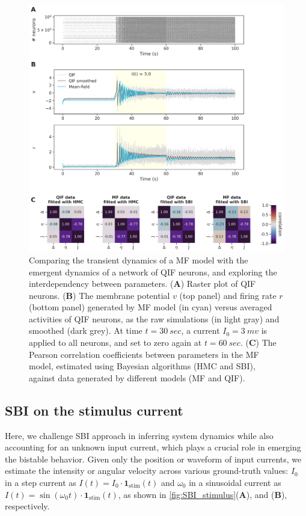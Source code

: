\documentclass[preprint,11pt,authoryear]{elsarticle}
\begin{document}
\begin{figure}
     \centering
     \includegraphics[width=\linewidth]{Figs/Fig6.png}
     \caption{Comparing the transient dynamics of a MF model with the emergent dynamics of a network of QIF neurons, and exploring the interdependency between parameters. (\textbf{A}) Raster plot of QIF neurons. (\textbf{B}) The membrane potential $v$ (top panel) and firing rate $r$ (bottom panel) generated by MF model (in cyan) versus averaged activities of QIF neurons, as the raw simulations (in light gray) and smoothed (dark grey). At time $t=30~sec$, a current $I_0=3~ mv$ is applied to all neurons, and set to zero again at $t=60~sec$. (\textbf{C}) The Pearson correlation coefficients between parameters in the MF model, estimated using Bayesian algorithms (HMC and SBI), against data generated by different models (MF and QIF). }
     \label{fig:QIF_correlations}
 \end{figure}



 
\subsection{SBI on the stimulus current}

Here, we challenge SBI approach in inferring system dynamics while also accounting for an unknown input current, which plays a crucial role in emerging the bistable behavior. Given only the position or waveform of input currents, we estimate the intensity or angular velocity across various ground-truth values: $I_0$ in a step current as $I(t)=I_0 \cdot \mathbf{1}_{\text{stim}}(t)$ and $\omega_0$ in a sinusoidal current as $I(t)=\sin (\omega_0 t) \cdot \mathbf{1}_{\text{stim}}(t)$, as shown in \autoref{fig:SBI_stimulus}(\textbf{A}), and (\textbf{B}), respectively. 
\end{document}
